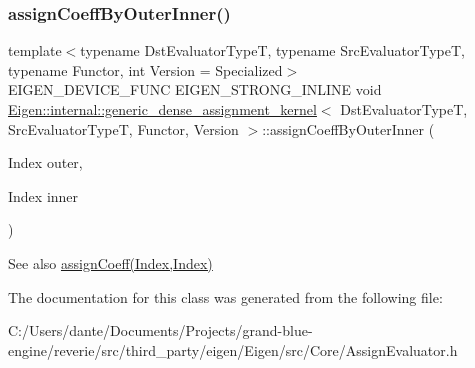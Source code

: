 \subsubsection{\texorpdfstring{assignCoeffByOuterInner()}{assignCoeffByOuterInner()}}
{\footnotesize\ttfamily template$<$typename Dst\+Evaluator\+TypeT, typename Src\+Evaluator\+TypeT, typename Functor, int Version = Specialized$>$ \\
E\+I\+G\+E\+N\+\_\+\+D\+E\+V\+I\+C\+E\+\_\+\+F\+U\+NC E\+I\+G\+E\+N\+\_\+\+S\+T\+R\+O\+N\+G\+\_\+\+I\+N\+L\+I\+NE void \mbox{\hyperlink{class_eigen_1_1internal_1_1generic__dense__assignment__kernel}{Eigen\+::internal\+::generic\+\_\+dense\+\_\+assignment\+\_\+kernel}}$<$ Dst\+Evaluator\+TypeT, Src\+Evaluator\+TypeT, Functor, Version $>$\+::assign\+Coeff\+By\+Outer\+Inner (\begin{DoxyParamCaption}\item[{Index}]{outer,  }\item[{Index}]{inner }\end{DoxyParamCaption})\hspace{0.3cm}{\ttfamily [inline]}}

\begin{DoxySeeAlso}{See also}
\mbox{\hyperlink{class_eigen_1_1internal_1_1generic__dense__assignment__kernel_a7ca974cc4049f1ef3d6f2feac94ea35b}{assign\+Coeff(\+Index,\+Index)}} 
\end{DoxySeeAlso}


The documentation for this class was generated from the following file\+:\begin{DoxyCompactItemize}
\item 
C\+:/\+Users/dante/\+Documents/\+Projects/grand-\/blue-\/engine/reverie/src/third\+\_\+party/eigen/\+Eigen/src/\+Core/Assign\+Evaluator.\+h\end{DoxyCompactItemize}
